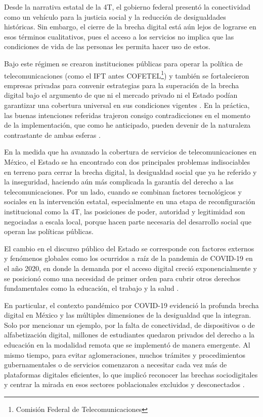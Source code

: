\documentclass[
  spanish,
  11pt,
  a4paper,
]{scrbook}
\begin{document}
Desde la narrativa estatal de la 4T, el gobierno federal presentó la
conectividad como un vehículo para la justicia social y la reducción de
desigualdades históricas. Sin embargo, el cierre de la brecha digital
está aún lejos de lograrse en esos términos cualitativos, pues el acceso
a los servicios no implica que las condiciones de vida de las personas
les permita hacer uso de estos.

Bajo este régimen se crearon instituciones públicas para operar la
política de telecomunicaciones (como el IFT antes COFETEL\footnote{Comisión
  Federal de Telecomunicaciones}) y también se fortalecieron empresas
privadas para convenir estrategias para la superación de la brecha
digital bajo el argumento de que ni el mercado privado ni el Estado
podían garantizar una cobertura universal en sus condiciones vigentes
\autocite{Reynoso2014}. En la práctica, las buenas intenciones referidas
trajeron consigo contradicciones en el momento de la implementación, que
como he anticipado, pueden devenir de la naturaleza contrastante de
ambas esferas \autocite{Castaneda2024}.

En la medida que ha avanzado la cobertura de servicios de
telecomunicaciones en México, el Estado se ha encontrado con dos
principales problemas indisociables en terreno para cerrar la brecha
digital, la desigualdad social que ya he referido y la inseguridad,
haciendo aún más complicada la garantía del derecho a las
telecomunicaciones. Por un lado, cuando se combinan factores
tecnológicos y sociales en la intervención estatal, especialmente en una
etapa de reconfiguración institucional como la 4T, las posiciones de
poder, autoridad y legitimidad son negociadas a escala local, porque
hacen parte necesaria del desarrollo social que operan las políticas
públicas.

El cambio en el discurso público del Estado se corresponde con factores
externos y fenómenos globales como los ocurridos a raíz de la pandemia
de COVID-19 en el año 2020, en donde la demanda por el acceso digital
creció exponencialmente y se posicionó como una necesidad de primer
orden para cubrir otros derechos fundamentales como la educación, el
trabajo y la salud \autocite{Lloyd2020}.

En particular, el contexto pandémico por COVID-19 evidenció la profunda
brecha digital en México y las múltiples dimensiones de la desigualdad
que la integran. Solo por mencionar un ejemplo, por la falta de
conectividad, de dispositivos o de alfabetización digital, millones de
estudiantes quedaron privados del derecho a la educación en la modalidad
remota que se implementó de manera emergente. Al mismo tiempo, para
evitar aglomeraciones, muchos trámites y procedimientos gubernamentales
o de servicios comenzaron a necesitar cada vez más de plataformas
digitales eficientes, lo que implicó reconocer las brechas
sociodigitales y centrar la mirada en esos sectores poblacionales
excluidos y desconectados \autocite{UNESCO2021,Garcia2021}.
\end{document}
